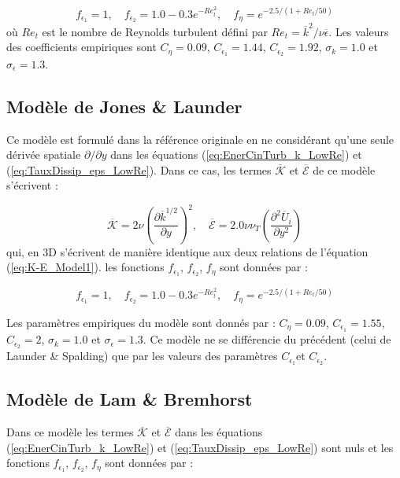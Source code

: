 \[
f_{\epsilon_{1}}=1,\quad f_{\epsilon_{2}}=1.0-0.3e^{-Re_{t}^{2}},\quad f_{\eta}=e^{-2.5/(1+Re_{t}/50)}
\]
o\`u $Re_{t}$ est le nombre de Reynolds turbulent d\'efini par $Re_{t}=\overline{k}^{2}/\nu\overline{\epsilon}$.
Les valeurs des coefficients empiriques sont $C_{\eta}=0.09$, $C_{\epsilon_{1}}=1.44$,
$C_{\epsilon_{2}}=1.92$, $\sigma_{k}=1.0$ et $\sigma_{\epsilon}=1.3$.


\subsection*{Mod\`ele de Jones \& Launder \cite{Jones-Launder_IJHMT1972}}

Ce mod\`ele est formul\'e dans la r\'ef\'erence originale \cite{Jones-Launder_IJHMT1972}
en ne consid\'erant qu'une seule d\'eriv\'ee spatiale $\partial/\partial y$
dans les \'equations (\ref{eq:EnerCinTurb_k_LowRe}) et (\ref{eq:TauxDissip_eps_LowRe}).
Dans ce cas, les termes $\overline{\mathcal{K}}$ et $\overline{\mathcal{E}}$
de ce mod\`ele s'\'ecrivent \cite[Eqs. (8) et (9)]{Jones-Launder_IJHMT1972}
:

\[
\overline{\mathcal{K}}=2\nu\left(\frac{\partial\overline{k}^{1/2}}{\partial y}\right)^{2},\quad\overline{\mathcal{E}}=2.0\nu\nu_{T}\left(\frac{\partial^{2}\overline{U}_{i}}{\partial y^{2}}\right)
\]
qui, en 3D s'\'ecrivent de mani\`ere identique aux deux relations de l'\'equation
(\ref{eq:K-E_Model1}). les fonctions $f_{\epsilon_{1}}$, $f_{\epsilon_{2}}$,
$f_{\eta}$ sont donn\'ees par \cite[Eq. (12)]{Jones-Launder_IJHMT1972}
:

\[
f_{\epsilon_{1}}=1,\quad f_{\epsilon_{2}}=1.0-0.3e^{-Re_{t}^{2}},\quad f_{\eta}=e^{-2.5/(1+Re_{t}/50)}
\]


Les param\`etres empiriques du mod\`ele sont donn\'es par \cite[Table 1]{Jones-Launder_IJHMT1972}
: $C_{\eta}=0.09$, $C_{\epsilon_{1}}=1.55$, $C_{\epsilon_{2}}=2$,
$\sigma_{k}=1.0$ et $\sigma_{\epsilon}=1.3$. Ce mod\`ele ne se diff\'erencie
du pr\'ec\'edent (celui de Launder \& Spalding) que par les valeurs des
param\`etres $C_{\epsilon_{1}}$et $C_{\epsilon_{2}}$.


\subsection*{Mod\`ele de Lam \& Bremhorst \cite{Lam-Bremhorst_JFE1981}}

Dans ce mod\`ele les termes $\overline{\mathcal{K}}$ et $\overline{\mathcal{E}}$
dans les \'equations (\ref{eq:EnerCinTurb_k_LowRe}) et (\ref{eq:TauxDissip_eps_LowRe})
sont nuls et les fonctions $f_{\epsilon_{1}}$, $f_{\epsilon_{2}}$,
$f_{\eta}$ sont donn\'ees par \cite[Eq. (11), (12) et (13)]{Lam-Bremhorst_JFE1981}
:

